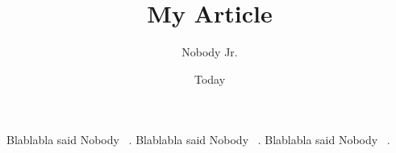 \documentclass[11pt]{article}
\begin{document}
\title{My Article}
\author{Nobody Jr.}
\date{Today}
\maketitle

Blablabla said Nobody ~\cite{abdf}.
Blablabla said Nobody ~\cite{sssss}.
Blablabla said Nobody ~\cite{article1}.

{}

\end{document}
